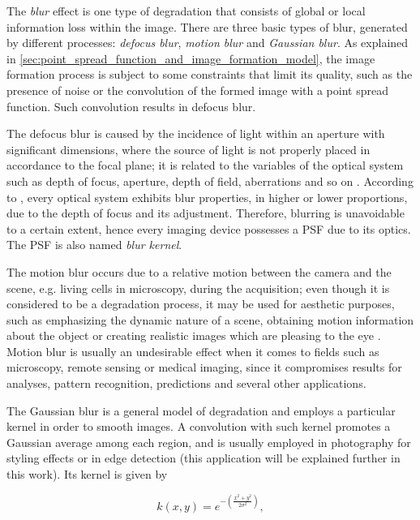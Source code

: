 The \emph{blur} effect is one type of degradation that consists of global or local information loss within the image. There are three basic types of blur, generated by different processes: \emph{defocus blur}, \emph{motion blur} and \emph{Gaussian blur}. As explained in \autoref{sec:point_spread_function_and_image_formation_model}, the image formation process is subject to some constraints that limit its quality, such as the presence of noise or the convolution of the formed image with a point spread function. Such convolution results in defocus blur. 

The defocus blur is caused by the incidence of light within an aperture with significant dimensions, where the source of light is not properly placed in accordance to the focal plane; it is related to the variables of the optical system such as depth of focus, aperture, depth of field, aberrations and so on \cite{joshi2014defocus}. According to , every optical system exhibits blur properties, in higher or lower proportions, due to the depth of focus and its adjustment. Therefore, blurring is unavoidable to a certain extent, hence every imaging device possesses a PSF due to its optics. The PSF is also named \emph{blur kernel}.

The motion blur occurs due to a relative motion between the camera and the scene, e.g. living cells in microscopy, during the acquisition; even though it is considered to be a degradation process, it may be used for aesthetic purposes, such as emphasizing the dynamic nature of a scene, obtaining motion information about the object or creating realistic images which are pleasing to the eye \cite{nayar2004motion}. Motion blur is usually an undesirable effect when it comes to fields such as microscopy, remote sensing or medical imaging, since it compromises results for analyses, pattern recognition, predictions and several other applications.

The Gaussian blur is a general model of degradation and employs a particular kernel in order to smooth images. A convolution with such kernel promotes a Gaussian average among each region, and is usually employed in photography for styling effects or in edge detection (this application will be explained further in this work). Its kernel \cite{nixon2019feature} is given by

\begin{equation}
\label{eqn:gaussian_blur}
k(x,y) = e^{-
            \left( 
                \frac{x^{2} + y^{2}}{2 \sigma^{2}}
            \right)
            },
\end{equation}


